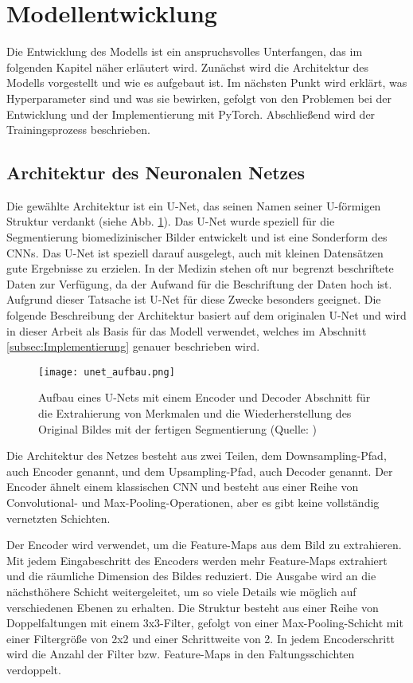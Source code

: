\section{Modellentwicklung}
Die Entwicklung des \gls{Modell}s ist ein anspruchsvolles Unterfangen, das im folgenden Kapitel näher erläutert wird. Zunächst wird die Architektur des \gls{Modell}s vorgestellt und wie es aufgebaut ist. Im nächsten Punkt wird erklärt, was Hyperparameter sind und was sie bewirken, gefolgt von den Problemen bei der Entwicklung und der Implementierung mit PyTorch. Abschließend wird der Trainingsprozess beschrieben.
\subsection{Architektur des Neuronalen Netzes}
\label{sec:Modellarchitektur}
Die gewählte Architektur ist ein U-Net, das seinen Namen seiner U-förmigen Struktur verdankt (siehe Abb. \ref{fig:unet_aufbau}). Das U-Net wurde speziell für die Segmentierung biomedizinischer Bilder entwickelt und ist eine Sonderform des \ac{CNN}s. Das U-Net ist speziell darauf ausgelegt, auch mit kleinen Datensätzen gute Ergebnisse zu erzielen. In der Medizin stehen oft nur begrenzt beschriftete Daten zur Verfügung, da der Aufwand für die Beschriftung der Daten hoch ist. Aufgrund dieser Tatsache ist U-Net für diese Zwecke besonders geeignet. Die folgende Beschreibung der Architektur basiert auf dem originalen U-Net und wird in dieser Arbeit als Basis für das \gls{Modell} verwendet, welches im Abschnitt \ref{subsec:Implementierung} genauer beschrieben wird.

\begin{figure}
	\centering
	\texttt{[image: unet\_aufbau.png]}
	\caption{Aufbau eines U-Nets mit einem Encoder und Decoder Abschnitt für die Extrahierung von Merkmalen und die Wiederherstellung des Original Bildes mit der fertigen Segmentierung (Quelle: \cite{Ronneberger2015})}
	\label{fig:unet_aufbau}
\end{figure}
Die Architektur des Netzes besteht aus zwei Teilen, dem Downsampling-Pfad, auch Encoder genannt, und dem Upsampling-Pfad, auch Decoder genannt. Der Encoder ähnelt einem klassischen \ac{CNN} und besteht aus einer Reihe von Convolutional- und Max-Pooling-Operationen, aber es gibt keine vollständig vernetzten Schichten. 

Der Encoder wird verwendet, um die Feature-Maps aus dem Bild zu extrahieren. Mit jedem Eingabeschritt des Encoders werden mehr Feature-Maps extrahiert und die räumliche Dimension des Bildes reduziert. Die Ausgabe wird an die nächsthöhere Schicht weitergeleitet, um so viele Details wie möglich auf verschiedenen Ebenen zu erhalten. Die Struktur besteht aus einer Reihe von Doppelfaltungen mit einem 3x3-Filter, gefolgt von einer Max-Pooling-Schicht mit einer Filtergröße von 2x2 und einer Schrittweite von 2. In jedem Encoderschritt wird die Anzahl der Filter bzw. Feature-Maps in den Faltungsschichten verdoppelt.

